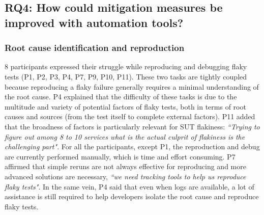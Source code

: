 

\subsection{\textsc{RQ4:} How could mitigation measures be improved with automation tools?}

\subsubsection{\textbf{Root cause identification and reproduction}}
8 participants expressed their struggle while reproducing and debugging flaky tests (P1, P2, P3, P4, P7, P9, P10, P11).
These two tasks are tightly coupled because reproducing a flaky failure generally requires a minimal understanding of the root cause.
P4 explained that the difficulty of these tasks is due to the multitude and variety of potential factors of flaky tests, both in terms of root causes and sources (from the test itself to complete external factors).
P11 added that the broadness of factors is particularly relevant for SUT flakiness: \textit{``Trying to figure out among 8 to 10 services what is the actual culprit of flakiness is the challenging part"}.
For all the participants, except P1, the reproduction and debug are currently performed manually, which is time and effort consuming.
P7 affirmed that simple reruns are not always effective for reproducing and more advanced solutions are necessary, \textit{``we need tracking tools to help us reproduce flaky tests"}.
In the same vein, P4 said that even when logs are available, a lot of assistance is still required to help developers isolate the root cause and reproduce flaky tests.

